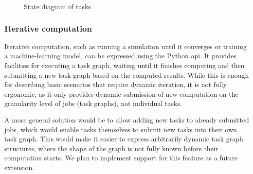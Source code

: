 \begin{figure}[h]
	\centering
	\caption{State diagram of \hyperqueue{} tasks}
	\label{fig:hq-task-state-diagram}
\end{figure}

\subsubsection*{Iterative computation}
Iterative computation, such as running a simulation until it converges or training a
machine-learning model, can be expressed using the \hyperqueue{} Python
\gls{api}. It provides facilities for executing a task graph, waiting until it
finishes computing and then submitting a new task graph based on the computed results. While this
is enough for describing basic scenarios that require dynamic iteration, it is not fully ergonomic,
as it only provides dynamic submission of new computation on the granularity level of jobs (task
graphs), not individual tasks.

A more general solution would be to allow adding new tasks to already submitted
\hyperqueue{} jobs, which would enable tasks themselves to submit new tasks into their
own task graph. This would make it easier to express arbitrarily dynamic task graph structures,
where the shape of the graph is not fully known before their computation starts. We plan to
implement support for this feature as a future extension.

